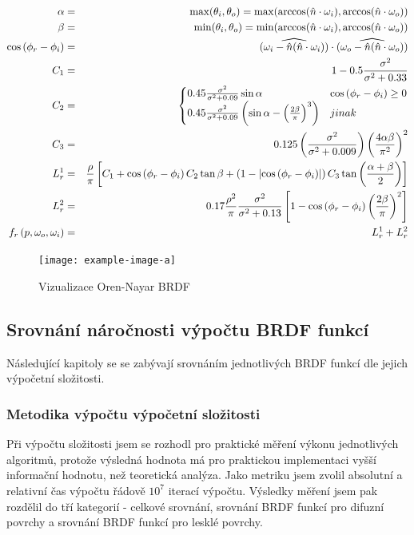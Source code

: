 \documentclass[czech,master]{diploma}
\newcommand{\uvec}[1]{\hat{#1}}
\newcommand{\point}{p}
\newcommand{\brdf}{f_r\left(\point,\omega_{o},\omega_{i}\right)}
\newcommand{\normVec}{\uvec{n}}
\newcommand{\inVec}{\omega_{i}}
\newcommand{\outVec}{\omega_{o}}
\newcommand{\alb}{\rho}
\newcommand{\rough}{\sigma}
\begin{document}
\begin{eqnarray}
  \alpha & = & \max(\theta_i , \theta_o) = \max(\arccos(\normVec\cdot\inVec), \arccos(\normVec\cdot\outVec)) \nonumber \\
  \beta & = & \min(\theta_i , \theta_o) = \min(\arccos(\normVec\cdot\inVec), \arccos(\normVec\cdot\outVec)) \nonumber \\
  \cosphiri & = & \widehat{\left( \inVec - \normVec(\normVec\cdot\inVec) \right)} \cdot \widehat{\left( \outVec - \normVec(\normVec\cdot\outVec)  \right)} \nonumber \\
  C_1 & = & 1-0.5\frac{\rough^{2}}{\rough^{2} + 0.33} \nonumber \\
  C_2 & = & \left\{\begin{matrix*}[l] 0.45\frac{\rough^{2}}{\rough^{2}+0.09}\sin\alpha & \cosphiri \geq 0\\ 0.45\frac{\rough^{2}}{\rough^2+0.09}\left(\sin\alpha-\left(\frac{2\beta}{\pi}\right)^{3}\right) & jinak \end{matrix*}\right. \nonumber \\
  C_3 & = & 0.125\left(\frac{\rough^2}{\rough^2 + 0.009}\right)\left(\frac{4\alpha\beta}{\pi^2}\right)^{2} \nonumber \\
  L^{1}_{r} & = & \frac{\alb}{\pi}\left[C_1 + \cosphiri C_2\tan\beta + \left( 1-\left | \cosphiri  \right | \right)C_3\tan \left(\frac{\alpha+\beta}{2}\right)\right] \nonumber \\
  L^{2}_{r} & = & 0.17\frac{\alb^{2}}{\pi}\frac{\rough^{2}}{\rough^2+0.13}\left[1 - \cosphiri  \left(\frac{2\beta}{\pi}\right)^{2} \right] \nonumber \\
  \brdf & = & L^{1}_{r} + L^{2}_{r} \label{eq:OrenNayar}
\end{eqnarray}

\begin{figure}[ht]%
  \centering\texttt{[image: example-image-a]}%
  \caption{Vizualizace Oren-Nayar BRDF}%
  \label{fig:orenNayarBRDFRender}%
\end{figure}

\subsection{Srovnání náročnosti výpočtu BRDF funkcí}
Následující kapitoly se se zabývají srovnáním jednotlivých BRDF funkcí dle jejich výpočetní složitosti.
\subsubsection{Metodika výpočtu výpočetní složitosti}
Při výpočtu složitosti jsem se rozhodl pro praktické měření výkonu jednotlivých algoritmů, protože výsledná hodnota má pro praktickou implementaci vyšší informační hodnotu, než teoretická analýza. Jako metriku jsem zvolil absolutní a relativní čas výpočtu řádově \(10^7\) iterací výpočtu. Výsledky měření jsem pak rozdělil do tří kategorií - celkové srovnání, srovnání BRDF funkcí pro difuzní povrchy a srovnání BRDF funkcí pro lesklé povrchy.
\end{document}
